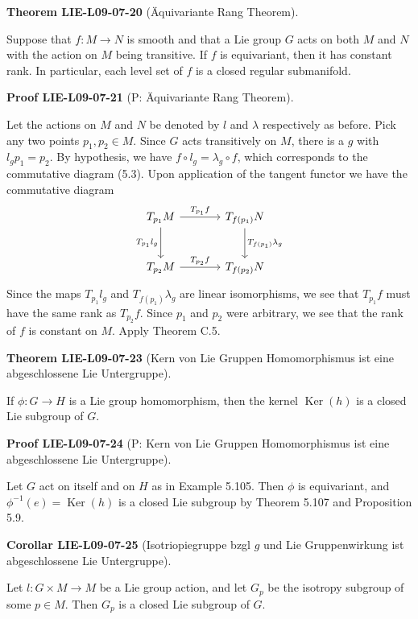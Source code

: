 \documentclass[10pt, letterpaper]{article}
\newcommand{\CustomHeading}[3]{%
  \par\medskip\noindent%
  \textbf{#1 #2} \textnormal{(#3)}.\enskip%
}
\newenvironment{THEO}[2]{\CustomHeading{Theorem}{#1}{#2}}{}
\newenvironment{KORO}[2]{\CustomHeading{Corollar}{#1}{#2}}{}
\newenvironment{PROOF}[2]{\CustomHeading{Proof}{#1}{#2}}{}
\begin{document}
\begin{THEO}{LIE-L09-07-20}{Äquivariante Rang Theorem}
Suppose that $f: M \rightarrow N$ is smooth and that a Lie group $G$ acts on both $M$ and $N$ with the action on $M$ being transitive. If $f$ is equivariant, then it has constant rank. In particular, each level set of $f$ is a closed regular submanifold.
\end{THEO}

\begin{PROOF}{LIE-L09-07-21}{P: Äquivariante Rang Theorem}
Let the actions on $M$ and $N$ be denoted by $l$ and $\lambda$ respectively as before. Pick any two points $p_{1}, p_{2} \in M$. Since $G$ acts transitively on $M$, there is a $g$ with $l_{g} p_{1}=p_{2}$. By hypothesis, we have $f \circ l_{g}=\lambda_{g} \circ f$, which corresponds to the commutative diagram (5.3). Upon application of the tangent functor we have the commutative diagram
\[
\begin{tikzcd}[row sep=large, column sep=large]
T_{p_1} M \arrow[r, "T_{p_1} f"] \arrow[d, "T_{p_1} l_g"'] & T_{f(p_1)} N \arrow[d, "T_{f(p_1)} \lambda_g"] \\
T_{p_2} M \arrow[r, "T_{p_2} f"] & T_{f(p_2)} N
\end{tikzcd}
\]
Since the maps $T_{p_{1}} l_{g}$ and $T_{f\left(p_{1}\right)} \lambda_{g}$ are linear isomorphisms, we see that $T_{p_{1}} f$ must have the same rank as $T_{p_{2}} f$. Since $p_{1}$ and $p_{2}$ were arbitrary, we see that the rank of $f$ is constant on $M$. Apply Theorem C.5.
\end{PROOF}

\begin{THEO}{LIE-L09-07-23}{Kern von Lie Gruppen Homomorphismus ist eine abgeschlossene Lie Untergruppe}
If $\phi: G \rightarrow H$ is a Lie group homomorphism, then the kernel $\operatorname{Ker}(h)$ is a closed Lie subgroup of $G$.
\end{THEO}

\begin{PROOF}{LIE-L09-07-24}{P: Kern von Lie Gruppen Homomorphismus ist eine abgeschlossene Lie Untergruppe}
Let $G$ act on itself and on $H$ as in Example 5.105. Then $\phi$ is equivariant, and $\phi^{-1}(e)=\operatorname{Ker}(h)$ is a closed Lie subgroup by Theorem 5.107 and Proposition 5.9.
\end{PROOF}

\begin{KORO}{LIE-L09-07-25}{Isotriopiegruppe bzgl $g$ und Lie Gruppenwirkung ist abgeschlossene Lie Untergruppe}
Let $l: G \times M \rightarrow M$ be a Lie group action, and let $G_{p}$ be the isotropy subgroup of some $p \in M$. Then $G_{p}$ is a closed Lie subgroup of $G$.
\end{KORO}
\end{document}

